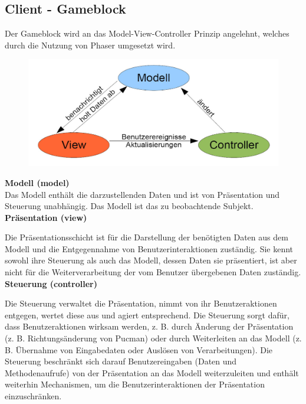 \documentclass[11pt,a4paper]{article}
\begin{document}
\subsection{Client - Gameblock}
Der Gameblock wird an das Model-View-Controller Prinzip angelehnt, welches durch die Nutzung von Phaser umgesetzt wird. 
\begin{figure}[htb]
  \centering
  \includegraphics[scale=0.2]{mvc.jpg}
  \label{PNFs}
\end{figure} 

\clearpage 



\textbf{Modell (model)} \\
Das Modell enthält die darzustellenden Daten und ist von Präsentation und Steuerung unabhängig. Das Modell ist das zu beobachtende Subjekt.\\
\textbf{Präsentation (view)} \par\bigskip \par\bigskip

Die Präsentationsschicht ist für die Darstellung der benötigten Daten aus dem Modell und die Entgegennahme von Benutzerinteraktionen zuständig. Sie kennt sowohl ihre Steuerung als auch das Modell, dessen Daten sie präsentiert, ist aber nicht für die Weiterverarbeitung der vom Benutzer übergebenen Daten zuständig. \\
\textbf{Steuerung (controller)} \par\bigskip \par\bigskip

Die Steuerung verwaltet die Präsentation, nimmt von ihr Benutzeraktionen entgegen, wertet diese aus und agiert entsprechend. Die Steuerung sorgt dafür, dass Benutzeraktionen wirksam werden, z. B. durch Änderung der Präsentation (z. B. Richtungsänderung von Pucman) oder  durch Weiterleiten an das Modell (z. B. Übernahme von Eingabedaten oder  Auslösen von Verarbeitungen). Die Steuerung beschränkt sich darauf Benutzereingaben (Daten und Methodenaufrufe) von der Präsentation an das Modell weiterzuleiten und enthält weiterhin Mechanismen, um die Benutzerinteraktionen der Präsentation einzuschränken.
\end{document}
